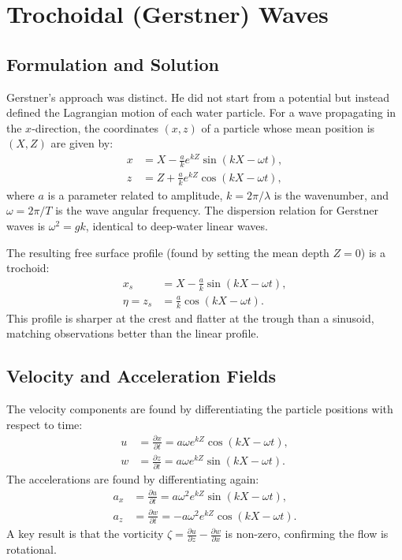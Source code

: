 \documentclass[11pt,letterpaper]{article}
\begin{document}
    \section{Trochoidal (Gerstner) Waves}
    \subsection{Formulation and Solution}
    Gerstner's approach was distinct. He did not start from a potential but instead defined the Lagrangian motion of each water particle. For a wave propagating in the $x$-direction, the coordinates $(x, z)$ of a particle whose mean position is $(X, Z)$ are given by:
    \begin{align}
        x &= X - \frac{a}{k} e^{kZ} \sin(kX - \omega t), \\
        z &= Z + \frac{a}{k} e^{kZ} \cos(kX - \omega t),
    \end{align}
    where $a$ is a parameter related to amplitude, $k=2\pi/\lambda$ is the wavenumber, and $\omega=2\pi/T$ is the wave angular frequency. The dispersion relation for Gerstner waves is $\omega^2 = gk$, identical to deep-water linear waves.

    The resulting free surface profile (found by setting the mean depth $Z=0$) is a trochoid:
    \begin{align}
        x_s &= X - \frac{a}{k} \sin(kX - \omega t), \\
        \eta = z_s &= \frac{a}{k} \cos(kX - \omega t).
    \end{align}
    This profile is sharper at the crest and flatter at the trough than a sinusoid, matching observations better than the linear profile.

    \subsection{Velocity and Acceleration Fields}
    The velocity components are found by differentiating the particle positions with respect to time:
    \begin{align}
        u &= \frac{\partial x}{\partial t} = a \omega e^{kZ} \cos(kX - \omega t), \\
        w &= \frac{\partial z}{\partial t} = a \omega e^{kZ} \sin(kX - \omega t).
    \end{align}
    The accelerations are found by differentiating again:
    \begin{align}
        a_x &= \frac{\partial u}{\partial t} = a \omega^2 e^{kZ} \sin(kX - \omega t), \\
        a_z &= \frac{\partial w}{\partial t} = -a \omega^2 e^{kZ} \cos(kX - \omega t).
    \end{align}
    A key result is that the vorticity $\zeta = \frac{\partial u}{\partial z} - \frac{\partial w}{\partial x}$ is non-zero, confirming the flow is rotational.
\end{document}
